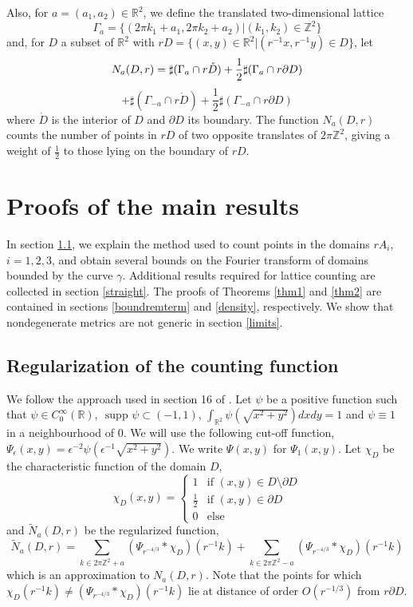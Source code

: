 \documentclass[12pt]{amsart}
\numberwithin{equation}{subsection}
\theoremstyle{definition}
\theoremstyle{plain}
\begin{document}
Also, for $a=(a_1,a_2) \in \mathbb{R}^2$, we define the translated two-dimensional lattice
\[
\Gamma_a = \{\left(2 \pi k_1 +a_1 , 2 \pi k_2 + a_2 \right) | (k_1,k_2) \in \mathbb Z^2 \}
\]
and, for $D$ a subset of $\mathbb{R}^2$ with $rD=\{ (x,y) \in \mathbb{R}^2 | (r^{-1}x,r^{-1}y) \in D\}$, let
\[
N_a(D,r)  =   \sharp(\Gamma_a \cap r\mathring{D}) +  \frac{1}{2} \sharp (\Gamma_a \cap r \partial D) \\
\]
\[
 +   \sharp(\Gamma_{-a} \cap r\mathring{D}) + \frac{1}{2} \sharp (\Gamma_{-a} \cap r \partial D)
\]
where $\mathring{D}$ is the interior of $D$ and $\partial D$ its boundary.
The function $N_a(D,r)$ counts the number of points in $rD$ of two opposite translates of $2\pi \mathbb{Z}^2$, giving
a weight of $\frac{1}{2}$ to those lying on the boundary of $rD$.

\section{Proofs of the main results}
In section \ref{section31}, we explain the method used to count points in the domains $r A_i$, $i=1,2,3$,
and obtain several bounds on the Fourier transform of domains bounded by the curve $\gamma$.
Additional results required for lattice counting are collected in section \ref{straight}.
The proofs of Theorems \ref{thm1} and \ref{thm2} are contained in sections \ref{boundremterm} and \ref{density}, respectively.
We show that nondegenerate metrics are not generic in section \ref{limits}.

\subsection{Regularization of the counting function}
\label{section31}
We follow the approach used in section 16 of \cite{1}.
Let $\psi$ be a positive function such that $\psi \in C_{0}^{\infty}(\mathbb{R})$, $\text{ supp }
\psi \subset (-1,1)$,
$\int_{\mathbb R^2} \psi(\sqrt{x^2+y^2}) dx dy= 1$ and $\psi \equiv 1$ in a neighbourhood of $0$. We will use the following cut-off function, $\Psi_{\epsilon}(x,y) = \epsilon^{-2} \psi(\epsilon^{-1}\sqrt{x^2+y^2})$.
We write $\Psi(x,y)$ for $\Psi_1(x,y)$.
Let $\chi_{D}$ be the characteristic function of the domain $D$,
\[
\chi_{D}(x,y) =
\begin{cases}
1 & \text{if $(x,y) \in D \setminus \partial D$}\\
\frac{1}{2} & \text{if $(x,y) \in \partial D$}\\
0 & \text{else}
\end{cases}
\]
and $\tilde{N}_a(D,r)$ be the regularized function,
\[
\tilde{N}_a(D,r) = \sum_{k \in 2 \pi \mathbb Z^2 +a} (\Psi_{r^{-4/3}} \ast \chi_{D}) (r^{-1} k)
+
\sum_{k \in 2 \pi \mathbb Z^2 -a} (\Psi_{r^{-4/3}} \ast \chi_{D}) (r^{-1} k)
\]
which is an approximation to $N_a(D,r)$.
Note that the points for which $\chi_{D}(r^{-1} k) \neq (\Psi_{r^{-4/3}} \ast \chi_{D}) (r^{-1} k)$
lie at distance of order $O(r^{-1/3})$ from $r \partial D$.
\end{document}
